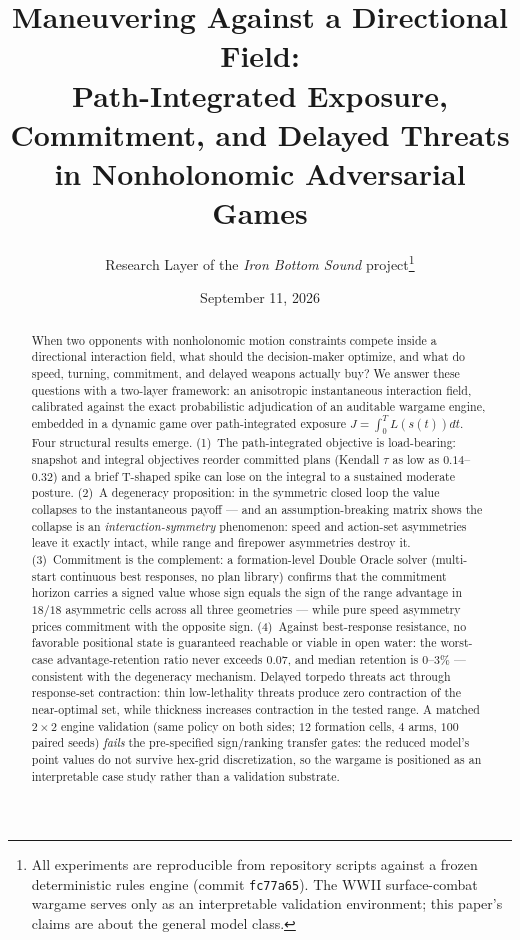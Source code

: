 \documentclass[12pt,a4paper]{article}
\title{Maneuvering Against a Directional Field:\\
Path-Integrated Exposure, Commitment, and Delayed Threats\\
in Nonholonomic Adversarial Games}
\author{Research Layer of the \emph{Iron Bottom Sound} project\thanks{All
experiments are reproducible from repository scripts against a frozen
deterministic rules engine (commit \texttt{fc77a65}).  The WWII surface-combat
wargame serves only as an interpretable validation environment; this paper's
claims are about the general model class.}}
\date{September 11, 2026}
\begin{document}
\maketitle

\begin{abstract}
When two opponents with nonholonomic motion constraints compete inside a
directional interaction field, what should the decision-maker optimize, and
what do speed, turning, commitment, and delayed weapons actually buy?  We
answer these questions with a two-layer framework: an anisotropic
instantaneous interaction field, calibrated against the exact probabilistic
adjudication of an auditable wargame engine, embedded in a dynamic game over
path-integrated exposure $J=\int_0^T L(s(t))dt$.  Four structural results
emerge.  (1)~The path-integrated objective is load-bearing: snapshot and
integral objectives reorder committed plans (Kendall $\tau$ as low as
$0.14$--$0.32$) and a brief T-shaped spike can lose on the integral to a
sustained moderate posture.  (2)~A degeneracy proposition: in the symmetric
closed loop the value collapses to the instantaneous payoff --- and an
assumption-breaking matrix shows the collapse is an
\emph{interaction-symmetry} phenomenon: speed and action-set asymmetries
leave it exactly intact, while range and firepower asymmetries destroy it.
(3)~Commitment is the complement: a formation-level Double Oracle solver
(multi-start continuous best responses, no plan library) confirms that
the commitment horizon carries a signed value whose sign equals the sign
of the range advantage in $18/18$ asymmetric cells across all three
geometries --- while pure speed asymmetry prices commitment with the
opposite sign.  (4)~Against best-response resistance, no favorable
positional state is guaranteed reachable or viable in open water: the
worst-case advantage-retention ratio never exceeds $0.07$, and median
retention is $0$--$3\%$ --- consistent with the degeneracy mechanism.
Delayed torpedo threats act through response-set contraction: thin
low-lethality threats produce zero contraction of the near-optimal set,
while thickness increases contraction in the tested range.  A matched
$2\times2$ engine validation (same policy on both sides; $12$ formation
cells, $4$ arms, $100$ paired seeds) \emph{fails} the pre-specified
sign/ranking transfer gates: the reduced model's point values do not
survive hex-grid discretization, so the wargame is positioned as an
interpretable case study rather than a validation substrate.
\end{abstract}
\end{document}
